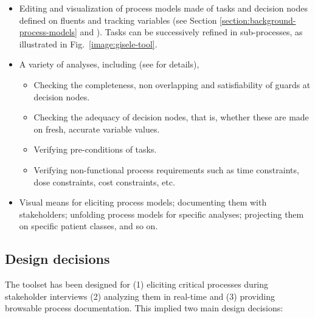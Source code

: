 \begin{itemize}
\item Editing and visualization of process models made of tasks and decision nodes defined on fluents and tracking variables (see Section \ref{section:background-process-models} and \cite{Damas:2009, Damas:2011}). Tasks can be successively refined in sub-processes, as illustrated in Fig.~\ref{image:gisele-tool}.
\item A variety of analyses, including (see \cite{Damas:2011} for details),
\begin{itemize}
\item Checking the completeness, non overlapping and satisfiability of guards at decision nodes.
\item Checking the adequacy of decision nodes, that is, whether these are made on fresh, accurate variable values.
\item Verifying pre-conditions of tasks.
\item Verifying non-functional process requirements such as time constraints, dose constraints, cost constraints, etc.
\end{itemize}
\item Visual means for eliciting process models; documenting them with stakeholders; unfolding process models for specific analyses; projecting them on specific patient classes, and so on.
\end{itemize}

\subsection*{Design decisions}

The toolset has been designed for (1) eliciting critical processes during stakeholder interviews (2) analyzing them in real-time and (3) providing browsable process documentation. This implied two main design decisions:

